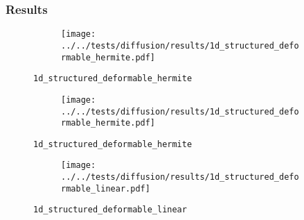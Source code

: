 \begin{frame}
  \frametitle{Results}
  \vspace*{-0.2cm}
  \begin{figure}[h!]
    \begin{subfigure}[t]{0.5\textwidth}%
    \centering
    \end{subfigure}
    \begin{subfigure}[t]{0.48\textwidth}%
      \centering%
      \texttt{[image: ../../tests/diffusion/results/1d\_structured\_deformable\_hermite.pdf]}%
    \end{subfigure}%
    \caption{\lstinline{1d_structured_deformable_hermite}}
  \end{figure} 
\end{frame}
%
%
\begin{frame}{}
  \vspace*{-0.2cm}
  \begin{figure}[h!]
    \begin{subfigure}[t]{0.5\textwidth}%
    \centering
    \end{subfigure}
    \begin{subfigure}[t]{0.48\textwidth}%
      \centering%
      \texttt{[image: ../../tests/diffusion/results/1d\_structured\_deformable\_hermite.pdf]}%
    \end{subfigure}%
    \caption{\lstinline{1d_structured_deformable_hermite}}
  \end{figure} 
\end{frame}
%
%
\begin{frame}{}
  \vspace*{-0.2cm}
  \begin{figure}[h!]
    \begin{subfigure}[t]{0.5\textwidth}%
    \centering    
    \end{subfigure}
    \begin{subfigure}[t]{0.48\textwidth}%
      \centering%
      \texttt{[image: ../../tests/diffusion/results/1d\_structured\_deformable\_linear.pdf]}%
    \end{subfigure}%
    \caption{\lstinline{1d_structured_deformable_linear}}
  \end{figure} 
\end{frame}
